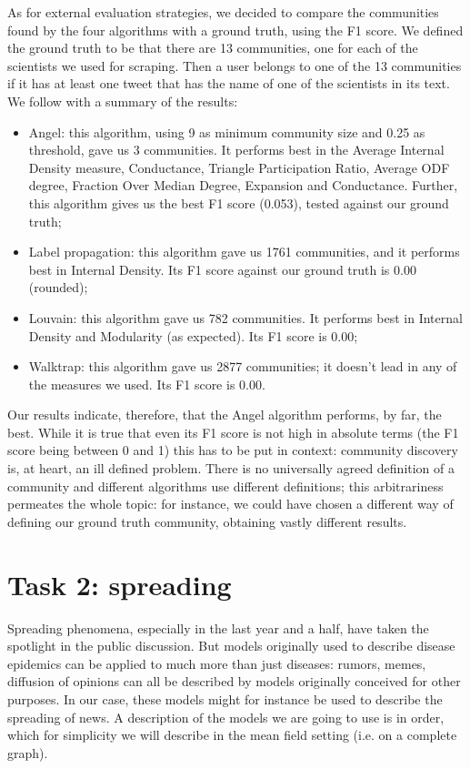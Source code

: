 \documentclass[sigchi]{acmart}
\begin{document}
As for external evaluation strategies, we decided to compare the communities found by the four algorithms with a ground truth, using the F1 score. We defined the ground truth to be that there are 13 communities, one for each of the scientists we used for scraping. Then a user belongs to one of the 13 communities if it has at least one tweet that has the name of one of the scientists in its text.
We follow with a summary of the results:
\begin{itemize}
    \item Angel: this algorithm, using 9 as minimum community size and 0.25 as threshold, gave us 3 communities. It performs best in the Average Internal Density measure, Conductance, Triangle Participation Ratio, Average ODF degree, Fraction Over Median Degree, Expansion and Conductance. Further, this algorithm gives us the best F1 score (0.053), tested against our ground truth;
    \item Label propagation: this algorithm gave us 1761 communities, and it performs best in Internal Density. Its F1 score against our ground truth is 0.00 (rounded);
    \item Louvain: this algorithm gave us 782 communities. It performs best in Internal Density and Modularity (as expected). Its F1 score is 0.00;
    \item Walktrap: this algorithm gave us 2877 communities; it doesn't lead in any of the measures we used. Its F1 score is 0.00.
\end{itemize}

Our results indicate, therefore, that the Angel algorithm performs, by far, the best. While it is true that even its F1 score is not high in absolute terms (the F1 score being between 0 and 1) this has to be put in context: community discovery is, at heart, an ill defined problem. There is no universally agreed definition of a community and different algorithms use different definitions; this arbitrariness permeates the whole topic: for instance, we could have chosen a different way of defining our ground truth community, obtaining vastly different results.



\section{Task 2: spreading}
Spreading phenomena, especially in the last year and a half, have taken the spotlight in the public discussion. But models originally used to describe disease epidemics can be applied to much more than just diseases: rumors, memes, diffusion of opinions can all be described by models originally conceived for other purposes. In our case, these models might for instance be used to describe the spreading of news. A description of the models we are going to use is in order, which for simplicity we will describe in the mean field setting (i.e. on a complete graph).
\end{document}
